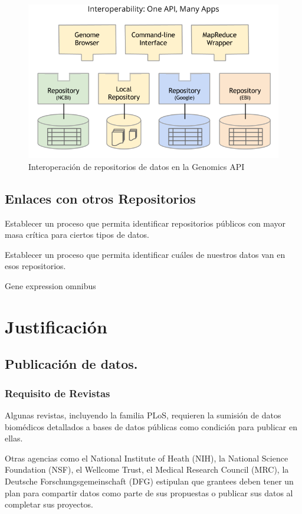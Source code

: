 \documentclass[
10pt, %
letterpaper, %
oneside, %
headinclude,footinclude, %
BCOR5mm, %
]{scrartcl}
\begin{document}
\begin{figure}[tb]
\centering 
\includegraphics[width=0.8\columnwidth]{GA4GH_API_interop.png} 
\caption[]{Interoperación de repositorios de datos en la Genomics API}
\label{fig:interop} 
\end{figure}



\subsection{Enlaces con otros Repositorios}
Establecer un proceso que permita identificar repositorios públicos
con mayor masa crítica para ciertos tipos de datos.

Establecer un proceso que permita identificar cuáles de nuestros datos
van en esos repositorios.
\cite{_genebank_????}
\cite{king_introduction_2007}

Gene expression omnibus

\section{Justificación}

\subsection{Publicación de datos.}


\subsubsection{Requisito de Revistas}

Algunas revistas, incluyendo la familia PLoS, requieren la sumisión de
datos biomédicos detallados a bases de datos públicas como condición
para publicar en ellas.\cite{piwowar_sharing_2007, hrynaszkiewicz}

Otras agencias como el National Institute of Heath (NIH), la National
Science Foundation (NSF), el Wellcome Trust, el Medical Research
Council (MRC), la Deutsche Forschungsgemeinschaft (DFG) estipulan que
grantees deben tener un plan para compartir datos como parte de sus
propuestas o publicar sus datos al completar sus
proyectos.\cite{wicherts_publish_2012}
\end{document}
